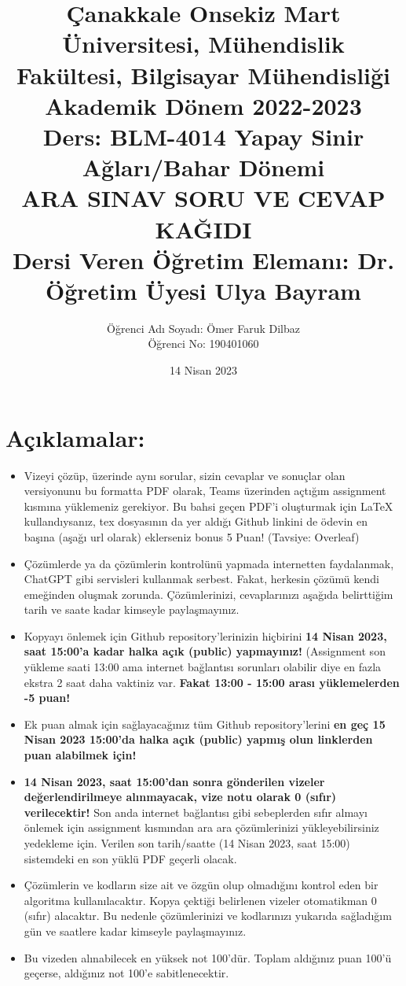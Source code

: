 \documentclass[11pt]{article}
\title{Çanakkale Onsekiz Mart Üniversitesi, Mühendislik Fakültesi, Bilgisayar Mühendisliği Akademik Dönem 2022-2023\\
Ders: BLM-4014 Yapay Sinir Ağları/Bahar Dönemi\\ 
ARA SINAV SORU VE CEVAP KAĞIDI\\
Dersi Veren Öğretim Elemanı: Dr. Öğretim Üyesi Ulya Bayram}
\author{%
\begin{minipage}{\textwidth}
\raggedright
Öğrenci Adı Soyadı: Ömer Faruk Dilbaz\\ %
Öğrenci No: 190401060
\end{minipage}%
}
\date{14 Nisan 2023}
\begin{document}
\maketitle

\vspace{-.5in}
\section*{Açıklamalar:}
\begin{itemize}
    \item Vizeyi çözüp, üzerinde aynı sorular, sizin cevaplar ve sonuçlar olan versiyonunu bu formatta PDF olarak, Teams üzerinden açtığım assignment kısmına yüklemeniz gerekiyor. Bu bahsi geçen PDF'i oluşturmak için LaTeX kullandıysanız, tex dosyasının da yer aldığı Github linkini de ödevin en başına (aşağı url olarak) eklerseniz bonus 5 Puan! (Tavsiye: Overleaf)
    \item Çözümlerde ya da çözümlerin kontrolünü yapmada internetten faydalanmak, ChatGPT gibi servisleri kullanmak serbest. Fakat, herkesin çözümü kendi emeğinden oluşmak zorunda. Çözümlerinizi, cevaplarınızı aşağıda belirttiğim tarih ve saate kadar kimseyle paylaşmayınız. 
    \item Kopyayı önlemek için Github repository'lerinizin hiçbirini \textbf{14 Nisan 2023, saat 15:00'a kadar halka açık (public) yapmayınız!} (Assignment son yükleme saati 13:00 ama internet bağlantısı sorunları olabilir diye en fazla ekstra 2 saat daha vaktiniz var. \textbf{Fakat 13:00 - 15:00 arası yüklemelerden -5 puan!}
    \item Ek puan almak için sağlayacağınız tüm Github repository'lerini \textbf{en geç 15 Nisan 2023 15:00'da halka açık (public) yapmış olun linklerden puan alabilmek için!}
    \item \textbf{14 Nisan 2023, saat 15:00'dan sonra gönderilen vizeler değerlendirilmeye alınmayacak, vize notu olarak 0 (sıfır) verilecektir!} Son anda internet bağlantısı gibi sebeplerden sıfır almayı önlemek için assignment kısmından ara ara çözümlerinizi yükleyebilirsiniz yedekleme için. Verilen son tarih/saatte (14 Nisan 2023, saat 15:00) sistemdeki en son yüklü PDF geçerli olacak.
    \item Çözümlerin ve kodların size ait ve özgün olup olmadığını kontrol eden bir algoritma kullanılacaktır. Kopya çektiği belirlenen vizeler otomatikman 0 (sıfır) alacaktır. Bu nedenle çözümlerinizi ve kodlarınızı yukarıda sağladığım gün ve saatlere kadar kimseyle paylaşmayınız.
    \item Bu vizeden alınabilecek en yüksek not 100'dür. Toplam aldığınız puan 100'ü geçerse, aldığınız not 100'e sabitlenecektir.

\end{itemize}
\end{document}
